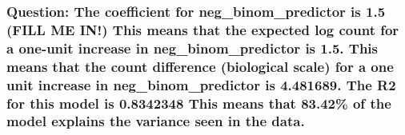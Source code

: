 \documentclass[
]{article}
\begin{document}
\subsubsection{Question: The coefficient for neg\_binom\_predictor is
1.5 (FILL ME IN!) This means that the expected log count for a one-unit
increase in neg\_binom\_predictor is 1.5. This means that the count
difference (biological scale) for a one unit increase in
neg\_binom\_predictor is 4.481689. The R2 for this model is 0.8342348
This means that 83.42\% of the model explains the variance seen in the
data.}\label{question-the-coefficient-for-neg_binom_predictor-is-1.5-fill-me-in-this-means-that-the-expected-log-count-for-a-one-unit-increase-in-neg_binom_predictor-is-1.5.-this-means-that-the-count-difference-biological-scale-for-a-one-unit-increase-in-neg_binom_predictor-is-4.481689.-the-r2-for-this-model-is-0.8342348-this-means-that-83.42-of-the-model-explains-the-variance-seen-in-the-data.}
\end{document}
